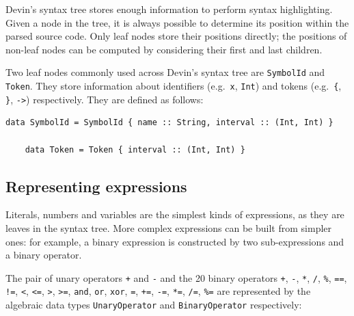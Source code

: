 \documentclass[UdineBachThesis,american,11pt]{PhdThesis}
\begin{document}
  Devin's syntax tree stores enough information to perform syntax highlighting.
  Given a node in the tree, it is always possible to determine its position
  within the parsed source code. Only leaf nodes store their positions directly;
  the positions of non-leaf nodes can be computed by considering their first and
  last children.

  Two leaf nodes commonly used across Devin's syntax tree are
  \mbox{\texttt{SymbolId}} and \mbox{\texttt{Token}}. They store information
  about identifiers (e.g.\ \texttt{x}, \mbox{\texttt{Int}}) and tokens (e.g.\
  \texttt{\{}, \texttt{\}}, \mbox{\texttt{->}}) respectively. They are defined
  as follows:

  \begin{Verbatim}[gobble=4,fontsize=\small]
    data SymbolId = SymbolId { name :: String, interval :: (Int, Int) }

    data Token = Token { interval :: (Int, Int) }
  \end{Verbatim}

  \newpage

  \subsection{Representing expressions}

  Literals, numbers and variables are the simplest kinds of expressions, as they
  are leaves in the syntax tree. More complex expressions can be built from
  simpler ones: for example, a binary expression is constructed by two
  sub-expressions and a binary operator.

  The pair of unary operators \texttt{+} and \texttt{-} and the 20 binary
  operators \texttt{+}, \texttt{-}, \texttt{*}, \texttt{/}, \texttt{\%},
  \mbox{\texttt{==}}, \mbox{\texttt{!=}}, \texttt{<}, \mbox{\texttt{<=}},
  \texttt{>}, \mbox{\texttt{>=}}, \mbox{\texttt{and}}, \mbox{\texttt{or}},
  \mbox{\texttt{xor}}, \texttt{=}, \mbox{\texttt{+=}}, \mbox{\texttt{-=}},
  \mbox{\texttt{*=}}, \mbox{\texttt{/=}}, \mbox{\texttt{\%=}} are represented by
  the algebraic data types \mbox{\texttt{UnaryOperator}} and
  \mbox{\texttt{BinaryOperator}} respectively:
\end{document}
